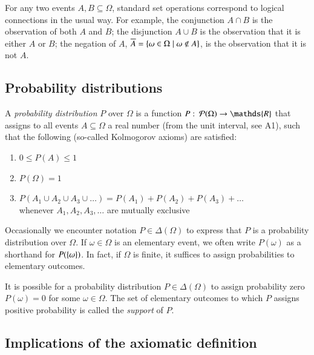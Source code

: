 \documentclass[nobib,nofonts]{tufte-handout}
\renewcommand{\markdef}[1]{\emph{#1}}
\begin{document}
For any two events $A, B \subseteq \Omega$, standard set operations correspond to logical
connections in the usual way. For example, the conjunction $A \cap B$ is the observation of
both $A$ and $B$; the disjunction $A \cup B$ is the observation that it is either $A$ or $B$;
the negation of $A$, $\overline{A} = \left\{\omega \in \Omega \mid \omega \not \in A\right\}$, is the
observation that it is not $A$.

\subsection{Probability distributions}

A \markdef{probability distribution} $P$ over $\Omega$ is a function
$P \mycolon \pow{\Omega} \rightarrow \mathds{R}$ that assigns to all events
$A \subseteq \Omega$ a real number (from the unit interval, see A1), such that the following
(so-called Kolmogorov axioms) are satisfied:
\begin{enumerate}[{A}1.]
\item $0 \le P(A) \le 1$
\item $P(\Omega) = 1$
\item $P(A_1 \cup A_2 \cup A_3 \cup \dots) = P(A_1) + P(A_2) + P(A_3) + \dots $ \\
  whenever $A_1, A_2, A_3, \dots$ are mutually exclusive
\end{enumerate}
Occasionally we encounter notation $P \in \Delta(\Omega)$ to express that $P$ is a probability
distribution over $\Omega$. If $\omega \in \Omega$ is an elementary event,
we often write $P(\omega)$ as a shorthand for $P(\left\{\omega\right\})$. In fact, if $\Omega$ is
finite, it suffices to assign probabilities to elementary outcomes.

It is possible for a probability distribution $P \in \Delta(\Omega)$ to assign probability zero $P(\omega) = 0$ for some $\omega \in \Omega$.
The set of elementary outcomes to which $P$ assigns positive probability is called the \emph{support} of $P$.

\subsection{Implications of the axiomatic definition}
\end{document}
